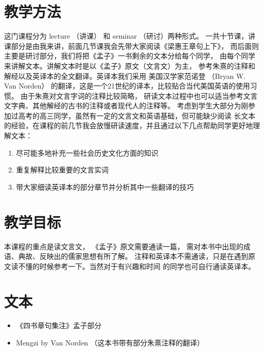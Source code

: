 \documentclass[12pt]{ctexart}
\begin{document}
\section{教学方法}
这门课程分为 lecture （讲课） 和 seminar （研讨）两种形式。
一共十节课，讲课部分是由我来讲，前面几节课我会先带大家阅读《梁惠王章句上下》，
而后面则主要是研讨部分，我们将把《孟子》一书剩余的文本分给每个同学，
由每个同学来讲解文本。讲解文本时是以《孟子》原文（文言文）为主，
参考朱熹的注释和解经以及英译本的全文翻译。英译本我们采用 美国汉学家范诺登
（Bryan W. Van Norden） 的翻译，这是一个21世纪的译本，比较贴合当代美国英语的使用习惯。
由于朱熹对文言字词的注释比较简略，
研读文本过程中也可以适当参考文言文字典、其他解经的古书的注释或者现代人的注释等。
考虑到学生大部分为刚参加过高考的高三同学，虽然有一定的文言文和英语基础，但可能缺少阅读
长文本的经验，在课程的前几节我会放慢研读速度，并且通过以下几点帮助同学更好地理解文本：
\begin{enumerate}
\item 尽可能多地补充一些社会历史文化方面的知识
\item 重复解释比较重要的文言实词
\item 带大家细读英译本的部分章节并分析其中一些翻译的技巧
\end{enumerate}
\section{教学目标}
本课程的重点是读文言文，
《孟子》原文需要通读一篇，
需对本书中出现的成语、典故、反映出的儒家思想有所了解。
注释和英译本不需通读，只是在遇到原文读不懂的时候参考一下。当然对于有兴趣和时间
的同学也可自行通读英译本。


\section{文本}
\begin{itemize}
\item《四书章句集注》孟子部分
\item Mengzi by Van Norden （这本书带有部分朱熹注释的翻译）
\end{itemize}
\end{document}
